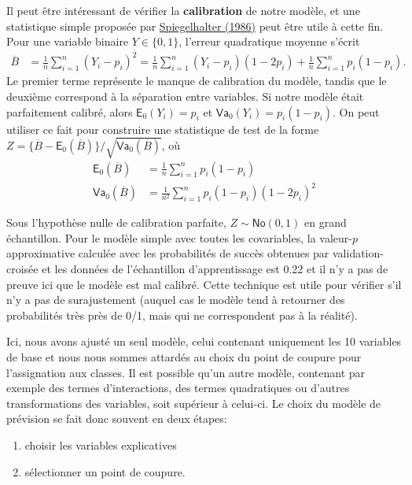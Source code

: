\documentclass[
  11pt,
  letterpaper,
]{book}
\providecommand{\tightlist}{%
  \setlength{\itemsep}{0pt}\setlength{\parskip}{0pt}}\usepackage{longtable,booktabs,array}
\theoremstyle{definition}
\theoremstyle{remark}
\begin{document}
Il peut être intéressant de vérifier la \textbf{calibration} de notre
modèle, et une statistique simple proposée par
\href{https://doi.org/10.1002/sim.4780050506}{Spiegelhalter (1986)} peut
être utile à cette fin. Pour une variable binaire \(Y \in \{0,1\}\),
l'erreur quadratique moyenne s'écrit \begin{align*}
\overline{B} &= \frac{1}{n} \sum_{i=1}^n (Y_i-p_i)^2 
=\frac{1}{n} \sum_{i=1}^n(Y_i-p_i)(1-2p_i) + \frac{1}{n} \sum_{i=1}^n p_i(1-p_i).
\end{align*} Le premier terme représente le manque de calibration du
modèle, tandis que le deuxième correspond à la séparation entre
variables. Si notre modèle était parfaitement calibré, alors
\(\mathsf{E}_0(Y_i)=p_i\) et \(\mathsf{Va}_0(Y_i) = p_i(1-p_i)\). On
peut utiliser ce fait pour construire une statistique de test de la
forme
\(Z = \{\overline{B} - \mathsf{E}_0(\overline{B})\}/\sqrt{\mathsf{Va}_0(\overline{B})}\),
où \begin{align*}
\mathsf{E}_0(\overline{B})&= \frac{1}{n} \sum_{i=1}^n p_i(1-p_i) \\
\mathsf{Va}_0(\overline{B})&= \frac{1}{n^2} \sum_{i=1}^n p_i(1-p_i)(1-2p_i)^2
\end{align*}

Sous l'hypothèse nulle de calibration parfaite,
\(Z \sim \mathsf{No}(0,1)\) en grand échantillon. Pour le modèle simple
avec toutes les covariables, la valeur-\(p\) approximative calculée avec
les probabilités de succès obtenues par validation-croisée et les
données de l'échantillon d'apprentissage est 0.22 et il n'y a pas de
preuve ici que le modèle est mal calibré. Cette technique est utile pour
vérifier s'il n'y a pas de surajustement (auquel cas le modèle tend à
retourner des probabilités très près de 0/1, mais qui ne correspondent
pas à la réalité).

Ici, nous avons ajusté un seul modèle, celui contenant uniquement les 10
variables de base et nous nous sommes attardés au choix du point de
coupure pour l'assignation aux classes. Il est possible qu'un autre
modèle, contenant par exemple des termes d'interactions, des termes
quadratiques ou d'autres transformations des variables, soit supérieur à
celui-ci. Le choix du modèle de prévision se fait donc souvent en deux
étapes:

\begin{enumerate}
\def\labelenumi{\arabic{enumi}.}
\tightlist
\item
  choisir les variables explicatives
\item
  sélectionner un point de coupure.
\end{enumerate}
\end{document}
